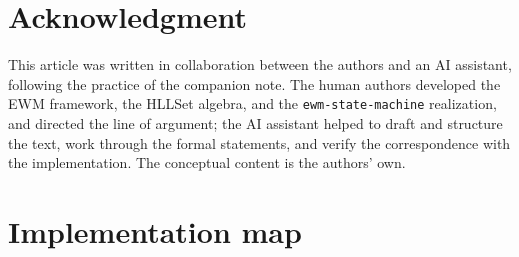 \documentclass[11pt,a4paper]{article}
\theoremstyle{remark}
\begin{document}
\section*{Acknowledgment}
This article was written in collaboration between the authors and an AI
assistant, following the practice of the companion note. The human authors
developed the EWM framework, the HLLSet algebra, and the
\texttt{ewm-state-machine} realization, and directed the line of argument; the
AI assistant helped to draft and structure the text, work through the formal
statements, and verify the correspondence with the implementation. The
conceptual content is the authors' own.

\appendix
\section{Implementation map}
\end{document}
